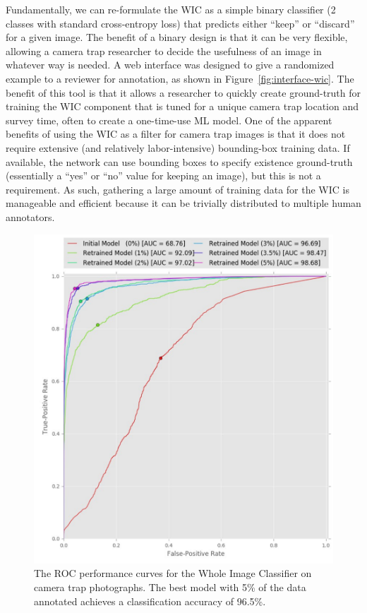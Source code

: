 Fundamentally, we can re-formulate the WIC as a simple binary classifier (2 classes with standard cross-entropy loss) that predicts either ``keep'' or ``discard'' for a given image.  The benefit of a binary design is that it can be very flexible, allowing a camera trap researcher to decide the usefulness of an image in whatever way is needed.  A web interface was designed to give a randomized example to a reviewer for annotation, as shown in Figure~\ref{fig:interface-wic}.  The benefit of this tool is that it allows a researcher to quickly create ground-truth for training the WIC component that is tuned for a unique camera trap location and survey time, often to create a one-time-use ML model.  One of the apparent benefits of using the WIC as a filter for camera trap images is that it does not require extensive (and relatively labor-intensive) bounding-box training data.  If available, the network can use bounding boxes to specify existence ground-truth (essentially a ``yes'' or ``no'' value for keeping an image), but this is not a requirement.  As such, gathering a large amount of training data for the WIC is manageable and efficient because it can be trivially distributed to multiple human annotators.

\begin{figure}[!t]
    \begin{center}
        \includegraphics[width=0.7\linewidth]{resources/classifier-roc-megan1.pdf}
    \end{center}
    \caption{The ROC performance curves for the Whole Image Classifier on camera trap photographs.  The best model with 5\% of the data annotated achieves a classification accuracy of 96.5\%.}
    \label{fig:performance-wic-cameratrap}
\end{figure}

